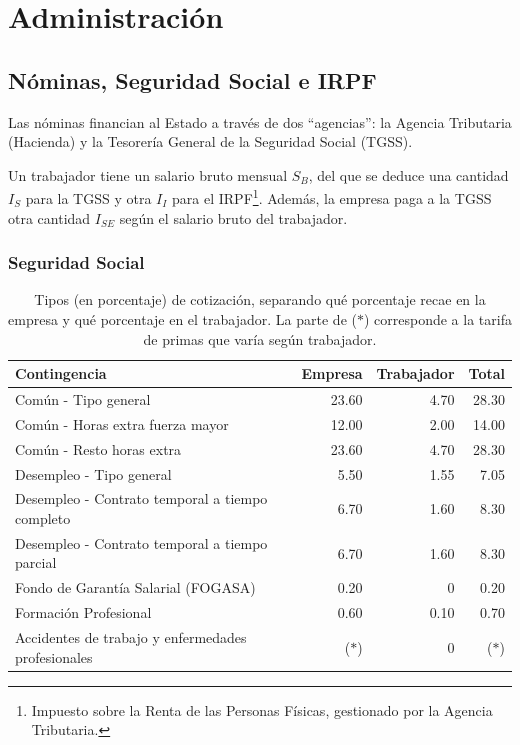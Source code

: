 \documentclass[nochap,palatino,shortheader]{apuntes}
\begin{document}
\section{Administración}

\subsection{Nóminas, Seguridad Social e IRPF}

Las nóminas financian al Estado a través de dos ``agencias'': la Agencia Tributaria (Hacienda) y la Tesorería General de la Seguridad Social (TGSS).

Un trabajador tiene un salario bruto mensual $S_B$, del que se deduce una cantidad $I_S$ para la TGSS y otra $I_I$ para el IRPF\footnote{Impuesto sobre la Renta de las Personas Físicas, gestionado por la Agencia Tributaria.}. Además, la empresa paga a la TGSS otra cantidad $I_{SE}$ según el salario bruto del trabajador.

\subsubsection{Seguridad Social}

\begin{table}[hbtp]
\centering
\footnotesize
\begin{tabular}{l|r|r|r}
\textbf{Contingencia} & \textbf{Empresa} & \textbf{Trabajador} & \textbf{Total} \\ \toprule
Común - Tipo general & 23.60 & 4.70 & 28.30 \\
Común - Horas extra fuerza mayor & 12.00 & 2.00 & 14.00 \\
Común - Resto horas extra & 23.60 & 4.70 & 28.30 \\ \midrule
Desempleo - Tipo general & 5.50 & 1.55 & 7.05 \\
Desempleo - Contrato temporal a tiempo completo & 6.70 & 1.60 & 8.30 \\
Desempleo - Contrato temporal a tiempo parcial & 6.70 & 1.60 & 8.30 \\ \midrule
Fondo de Garantía Salarial (FOGASA) & 0.20 & 0 & 0.20 \\ \midrule
Formación Profesional & 0.60 & 0.10 & 0.70 \\ \midrule
Accidentes de trabajo y enfermedades profesionales & ($\ast$) & 0 & ($\ast$) \\ \midrule
\end{tabular}
\caption{Tipos (en porcentaje) de cotización, separando qué porcentaje recae en la empresa y qué porcentaje en el trabajador. La parte de ($\ast$) corresponde a la tarifa de primas que varía según trabajador.}
\label{tab:TiposSegSocial}
\end{table}
\end{document}
